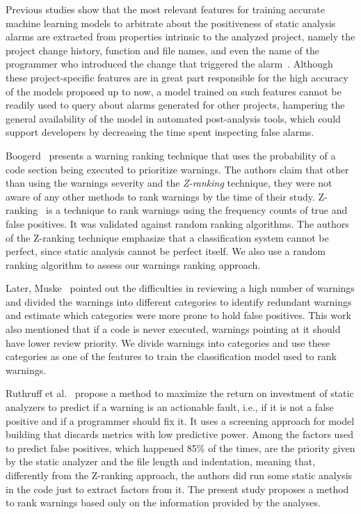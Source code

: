 
Previous studies show that the most relevant features for training accurate
machine learning models to arbitrate about the positiveness of static analysis
alarms are extracted from properties intrinsic to the analyzed project,
namely the project change history, function and file names, and even the name
of the programmer who introduced the change that triggered the
alarm~\cite{kremenek2004correlation, heckman2009model, jung2005taming,
ruthruff_predicting_2008, yoon2014reducing}. Although these project-specific
features are in great part responsible for the high accuracy of the models
proposed up to now, a model trained on such features cannot be readily used to
query about alarms generated for other projects, hampering the general
availability of the model in automated post-analysis tools, which could
support developers by decreasing the time spent inspecting false alarms.

Boogerd~\cite{boogerd2006prioritizing} presents a warning ranking technique
that uses the probability of a code section being executed to prioritize
warnings. The authors claim that other than using the warnings severity and the
\textit{Z-ranking} technique, they were not aware of any other methods to rank
warnings by the time of their study. Z-ranking~\cite{kremenek2003z} is a
technique to rank warnings using the frequency counts of true and false
positives. It was validated against random ranking algorithms. The
authors of the Z-ranking technique emphasize that a classification system
cannot be perfect, since static analysis cannot be perfect itself.
We also use a random ranking algorithm to assess our warnings ranking approach.

Later, Muske~\cite{muske2013review} pointed out the difficulties in reviewing a high
number of warnings and divided the warnings into different categories to identify
redundant warnings and estimate which categories were more prone to hold false
positives. This work also mentioned that if a code is never executed,
warnings pointing at it should have lower review priority.
We divide warnings into categories and use these categories as one of the features
to train the classification model used to rank warnings.

Ruthruff et al.~\cite{ruthruff_predicting_2008} propose a method to maximize
the return on investment of static analyzers to predict if a warning is an
actionable fault, i.e., if it is not a false positive and if a programmer
should fix it. It uses a screening approach for model building that discards
metrics with low predictive power. Among the factors used to predict false
positives, which happened 85\% of the times, are the priority given by the
static analyzer and the file length and indentation, meaning that, differently
from the Z-ranking approach, the authors did run some static analysis in the
code just to extract factors from it. The present study proposes a method to
rank warnings based only on the information provided by the analyses.

